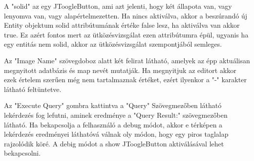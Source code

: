 A "solid" az egy JToogleButton, ami azt jelenti, hogy két állapota van, vagy lenyomva van, vagy alapértelmezetten. Ha nincs aktiválva, akkor a beszúrandó új Entity objektum solid attribútumának értéke false lesz, ha aktiválva van akkor true. Ez azért fontos mert az ütközésvizsgálat ezen attribútumra épül, ugyanis ha egy entitás nem solid, akkor az ütközésvizsgálat szempontjából semleges.

Az "Image Name" szövegdoboz alatt két felirat látható, amelyek az épp aktuálisan megnyitott adatbázis és map nevét mutatják. Ha megnyitjuk az editort akkor ezek értelem szerűen még nem tartalmaznak értéket, ezért ilyenkor a "-" karakter látható feltüntetve.

Az "Execute Query" gombra kattintva a "Query" Szövegmezőben látható lekérdezés fog lefutni, aminek eredménye a "Query Result:" szövegmezőben látható. Ha bekapcsolja a felhasználó a debug módot, akkor e térképen a lekérdezés eredményei láthatóvá válnak oly módon, hogy egy piros taglalap rajzolódik köré. A debig módot a show JToogleButton aktiválásával lehet bekapcsolni. 

